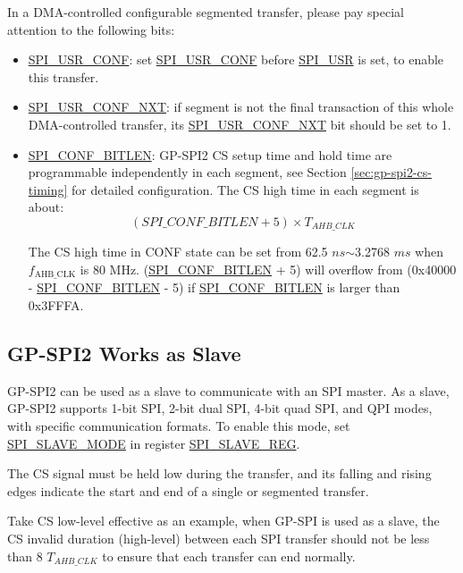 \documentclass[main\_\_EN.tex]{subfiles}
\begin{document}
In a DMA-controlled configurable segmented transfer, please pay special attention to the following bits:
\begin{itemize}
    \item \hyperref[fielddesc:SPIUSRCONF]{SPI\_USR\_CONF}: set \hyperref[fielddesc:SPIUSRCONF]{SPI\_USR\_CONF} before \hyperref[fielddesc:SPIUSR]{SPI\_USR} is set, to enable this transfer.
    \item \hyperref[fielddesc:SPIUSRCONFNXT]{SPI\_USR\_CONF\_NXT}: if segment  is not the final transaction of this whole DMA-controlled transfer, its \hyperref[fielddesc:SPIUSRCONFNXT]{SPI\_USR\_CONF\_NXT} bit should be set to 1.
    \item \hyperref[fielddesc:SPICONFBITLEN]{SPI\_CONF\_BITLEN}: GP-SPI2 CS setup time and hold time are programmable independently in each segment, see Section \ref{sec:gp-spi2-cs-timing} for detailed configuration. The CS high time in each segment is about:
    \[
    (\hyperref[fielddesc:SPICONFBITLEN]{SPI\_CONF\_BITLEN} + 5) \times T_{AHB\_CLK}
    \]

The CS high time in CONF state can be set from 62.5 $ns$$\sim$3.2768 $ms$ when $f_{\textrm{AHB\_CLK}}$  is 80 MHz.
(\hyperref[fielddesc:SPICONFBITLEN]{SPI\_CONF\_BITLEN} + 5) will overflow from (0x40000 - \hyperref[fielddesc:SPICONFBITLEN]{SPI\_CONF\_BITLEN} - 5) if \hyperref[fielddesc:SPICONFBITLEN]{SPI\_CONF\_BITLEN} is larger than 0x3FFFA. 
\end{itemize}

\subsection{GP-SPI2 Works as Slave}\label{sec:gp-spi2-slave-mode}

GP-SPI2 can be used as a slave to communicate with an SPI master. As a slave, GP-SPI2 supports 1-bit SPI, 2-bit dual SPI, 4-bit quad SPI, and QPI modes, with specific communication formats. To enable this mode, set \hyperref[fielddesc:SPISLAVEMODE]{SPI\_SLAVE\_MODE} in register \hyperref[regdesc:SPISLAVEREG]{SPI\_SLAVE\_REG}. 

The CS signal must be held low during the transfer, and its falling and rising edges indicate the start and end of a single or segmented transfer.

Take CS low-level effective as an example, when GP-SPI is used as a slave, the CS invalid duration (high-level) between each SPI transfer should not be less than 8 $T_{AHB\_CLK}$ to ensure that each transfer can end normally.
\end{document}
